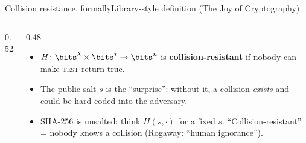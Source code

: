 \ifdefined\PRESENTATION\else\PassOptionsToClass{handout}{beamer}\fi\documentclass[aspectratio=169, lualatex]{beamer}
\begin{document}
\begin{frame}{Collision resistance, formally}{Library-style definition (The Joy of Cryptography)}
	\begin{columns}[c]
		\begin{column}{0.52\textwidth}
			\begin{center}
			\end{center}
		\end{column}
		\begin{column}{0.48\textwidth}
			\begin{itemize}
				\item $H\colon \bits^\lambda \times \bits^* \rightarrow \bits^n$ is \textbf{collision-resistant} if nobody can make \textsc{test} return true.
				\item The public salt $s$ is the ``surprise'': without it, a collision \emph{exists} and could be hard-coded into the adversary.
				\item SHA-256 is unsalted: think $H(s, \cdot)$ for a fixed $s$. ``Collision-resistant'' = nobody knows a collision (Rogaway: ``human ignorance'').
			\end{itemize}
		\end{column}
	\end{columns}
\end{frame}
\end{document}
